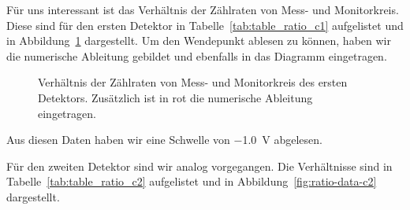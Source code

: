 \documentclass[11pt, ngerman, fleqn, DIV=15, headinclude, BCOR=2cm]{scrreprt}
\begin{document}
Für uns interessant ist das Verhältnis der Zählraten von Mess- und
Monitorkreis. Diese sind für den ersten Detektor in
Tabelle~\ref{tab:table_ratio_c1} aufgelistet und in
Abbildung~\ref{fig:ratio-data-c1} dargestellt. Um den Wendepunkt ablesen zu
können, haben wir die numerische Ableitung gebildet und ebenfalls in das
Diagramm eingetragen.

\begin{figure}[htbp]
    \centering
    \caption{%
        Verhältnis der Zählraten von Mess- und Monitorkreis des ersten
        Detektors. Zusätzlich ist in rot die numerische Ableitung eingetragen.
    }
    \label{fig:ratio-data-c1}
\end{figure}

Aus diesen Daten haben wir eine Schwelle von \SI{-1.0}{\volt} abgelesen.

Für den zweiten Detektor sind wir analog vorgegangen. Die Verhältnisse sind in
Tabelle~\ref{tab:table_ratio_c2} aufgelistet und in
Abbildung~\ref{fig:ratio-data-c2} dargestellt.
\end{document}
